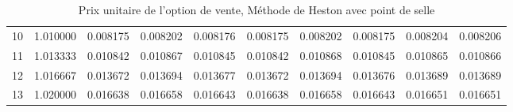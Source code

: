 \documentclass[letter]{report}
\begin{document}
\begin{Schunk}
\begin{table}[ht]
\begin{tabular}{rrrrrrrrrr}
  10 & 1.010000 & 0.008175 & 0.008202 & 0.008176 & 0.008175 & 0.008202 & 0.008175 & 0.008204 & 0.008206 \\ 
  11 & 1.013333 & 0.010842 & 0.010867 & 0.010845 & 0.010842 & 0.010868 & 0.010845 & 0.010865 & 0.010866 \\ 
  12 & 1.016667 & 0.013672 & 0.013694 & 0.013677 & 0.013672 & 0.013694 & 0.013676 & 0.013689 & 0.013689 \\ 
  13 & 1.020000 & 0.016638 & 0.016658 & 0.016643 & 0.016638 & 0.016658 & 0.016643 & 0.016651 & 0.016651 \\ 
   \hline
\end{tabular}
\caption{Prix unitaire de l'option de vente, Méthode de Heston avec point de selle} 
\end{table}\end{Schunk}
\end{document}
